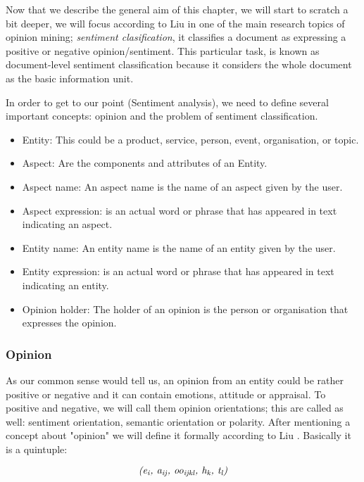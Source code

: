 Now that we describe the general aim of this chapter, we will start to scratch a bit deeper, we will focus according to Liu \cite%
{L2011} in one of the main research topics of opinion mining; \textit{sentiment clasification}, it classifies a document as expressing a positive or negative opinion/sentiment. This particular task, is known as document-level sentiment classification because it considers the whole document as the basic information unit. 

In order to get to our point (Sentiment analysis), we need to define several important concepts: opinion and the problem of sentiment classification.

\begin{itemize}
	\item Entity: This could be a product, service, person, event, organisation, or topic.
	\item Aspect: Are the components and attributes of an Entity.
	\item Aspect name: An aspect name is the name of an aspect given by the user.
	\item Aspect expression: is an actual word or phrase that has appeared in text indicating an aspect.
	\item Entity name: An entity name is the name of an entity given by the user.
	\item Entity expression: is an actual word or phrase that has appeared in text indicating an entity.
	\item Opinion holder: The holder of an opinion is the person or organisation that expresses the opinion.
\end{itemize}

\subsubsection{Opinion}\label{opinion}
As our common sense would tell us, an opinion from an entity could be rather positive or negative and it can contain emotions, attitude or appraisal.
To positive and negative, we will call them opinion orientations; this are called as well: sentiment orientation, semantic orientation or polarity.
After mentioning a concept about "opinion" we will define it formally according to Liu \cite%
{L2011}. Basically it is a quintuple:

\begin{equation} \label{eq:opinionQuintuple}
	\textit{(e\textsubscript{i}, a\textsubscript{ij}, oo\textsubscript{ijkl}, h\textsubscript{k}, t\textsubscript{l})}
\end{equation}



